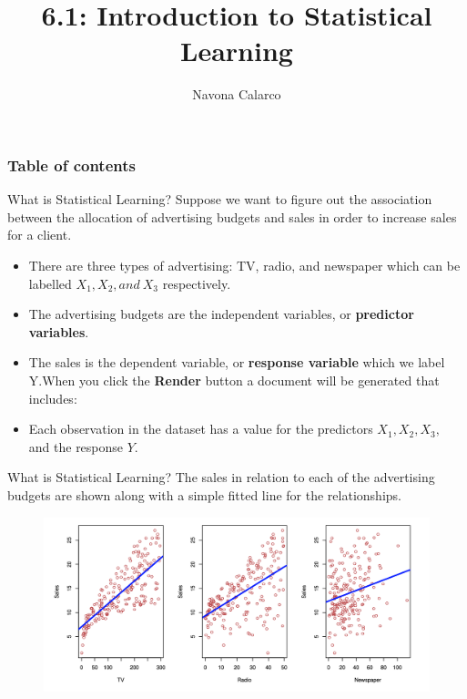 \documentclass[
  ignorenonframetext,
  aspectratio=169,
]{beamer}
\title{6.1: Introduction to Statistical Learning}
\author{Navona Calarco}
\date{}
\institute{The University of Toronto}
\renewcommand*\contentsname{Table of contents}
\newcommand\contentsname{Table of contents}
\begin{document}
\frame{\titlepage}
\ifdefined\Shaded\renewenvironment{Shaded}{\begin{tcolorbox}[sharp corners, breakable, enhanced, interior hidden, borderline west={3pt}{0pt}{shadecolor}, boxrule=0pt, frame hidden]}{\end{tcolorbox}}\fi

\renewcommand*\contentsname{Table of contents}
\begin{frame}[allowframebreaks]
  \frametitle{Table of contents}
  \tableofcontents[hideallsubsections]
\end{frame}
\begin{frame}{What is Statistical Learning?}
\protect\hypertarget{what-is-statistical-learning}{}
Suppose we want to figure out the
\alert{association between the allocation of advertising budgets and sales}
in order to increase sales for a client.

\begin{itemize}
\item
  There are three types of advertising: TV, radio, and newspaper which
  can be labelled \(X_1, X_2, and\ X_3\) respectively.
\item
  The advertising budgets are the independent variables, or
  \textbf{predictor variables}.
\item
  The sales is the dependent variable, or \textbf{response variable}
  which we label Y.When you click the \textbf{Render} button a document
  will be generated that includes:
\item
  Each observation in the dataset has a value for the predictors
  \(X_1, X_2, X_3,\) and the response \(Y\).
\end{itemize}
\end{frame}

\begin{frame}{What is Statistical Learning?}
\protect\hypertarget{what-is-statistical-learning-1}{}
The sales in relation to each of the advertising budgets are shown along
with a simple fitted line for the relationships.

\begin{figure}

{\centering \includegraphics[width=5.73958in,height=\textheight]{images/sales fig.png}

}

\end{figure}
\end{frame}
\end{document}
